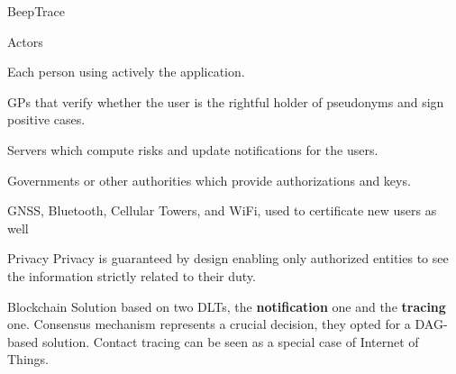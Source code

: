 \begin{frame}{BeepTrace}
    \begin{block}{Actors}
        \begin{description}
            \item[Users] Each person using actively the application. 
            \item[Diagnosticians] GPs that verify whether the user is the rightful holder of pseudonyms and sign positive cases.
            \item[GeoSolvers] Servers which compute risks and update notifications for the users.
            \item[Authorities] Governments or other authorities which provide authorizations and keys.
            \item[Pos. Providers] GNSS, Bluetooth, Cellular Towers, and WiFi, used to certificate new users as well
        \end{description}
    \end{block}
    
    \begin{block}{Privacy}
        Privacy is guaranteed by design enabling only authorized entities to see the information strictly related to their duty.
    \end{block}
    
    \begin{block}{Blockchain}
        Solution based on two DLTs, the \textbf{notification} one and the \textbf{tracing} one.
        Consensus mechanism represents a crucial decision, they opted for a DAG-based solution. Contact tracing can be seen as a special case of Internet of Things.
    \end{block}
\end{frame}